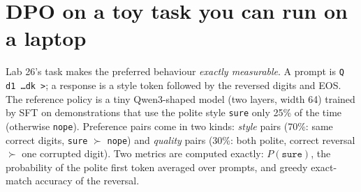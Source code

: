 \section{DPO on a toy task you can run on a laptop}\label{sec:dpo:toy}

Lab 26's task makes the preferred behaviour \emph{exactly measurable}. A prompt is
\texttt{Q d1 \ldots dk >}; a response is a style token followed by the reversed digits and EOS. The
reference policy is a tiny Qwen3-shaped model (two layers, width 64) trained by SFT on
demonstrations that use the polite style \texttt{sure} only 25\% of the time (otherwise
\texttt{nope}). Preference pairs come in two kinds: \emph{style} pairs (70\%: same correct digits,
\texttt{sure} $\succ$ \texttt{nope}) and \emph{quality} pairs (30\%: both polite, correct reversal
$\succ$ one corrupted digit). Two metrics are computed exactly: $P(\texttt{sure})$, the
probability of the polite first token averaged over prompts, and greedy exact-match accuracy of the
reversal.

